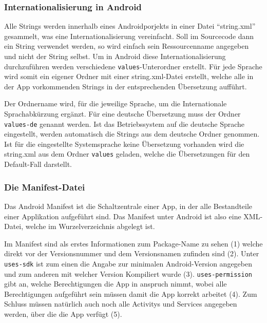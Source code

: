 \subsubsection{Internationalisierung in Android} \label{Internationalisierung in Android}
Alle Strings werden innerhalb eines Androidporjekts in einer Datei "`string.xml"' gesammelt, was eine Internationalisierung vereinfacht. Soll im Sourcecode dann ein String verwendet werden, so wird einfach sein Ressourcenname angegeben und nicht der String selbst. Um in Android diese Internationalisierung durchzuf\"uhren werden verschiedene \texttt{values}-Unterordner erstellt. F\"ur jede Sprache wird somit ein eigener Ordner mit einer string.xml-Datei erstellt, welche alle in der App vorkommenden Strings in der entsprechenden \"Ubersetzung auff\"uhrt. 

Der Ordnername wird, f\"ur die jeweilige Sprache, um die Internationale Sprachabk\"urzung erg\"anzt. F\"ur eine deutsche \"Ubersetzung muss der Ordner \texttt{values-de} genannt werden. Ist das Betriebssystem auf die deutsche Sprache eingestellt, werden automatisch die Strings aus dem deutsche Ordner genommen. Ist f\"ur die eingestellte Systemsprache keine \"Ubersetzung vorhanden wird die string.xml aus dem Ordner \texttt{values} geladen, welche die \"Ubersetzungen f\"ur den Default-Fall darstellt. \cite{VogelaI18N}
% 

\subsubsection{Die Manifest-Datei} \label{Die Manifest-Datei}
Das Android Manifest ist die Schaltzentrale einer App, in der alle Bestandteile einer Applikation aufgef\"uhrt sind. Das Manifest unter Android ist also eine XML-Datei, welche im Wurzelverzeichnis abgelegt ist. 

Im Manifest sind als erstes Informationen zum Package-Name zu sehen (1) welche direkt vor der Versionsnummer und dem Versionsnamen zufinden sind (2). Unter \texttt{uses-sdk} ist zum einen die Angabe zur minimalen Android-Version angegeben und zum anderen mit welcher Version Kompiliert wurde (3). \texttt{uses-permission} gibt an, welche Berechtigungen die App in anspruch nimmt, wobei alle Berechtigungen aufgef\"uhrt sein m\"ussen damit die App korrekt arbeitet (4). Zum Schluss m\"ussen nat\"urlich auch noch alle Activitys und Services angegeben werden, \"uber die die App verf\"ugt (5).
\cite{Android44}

